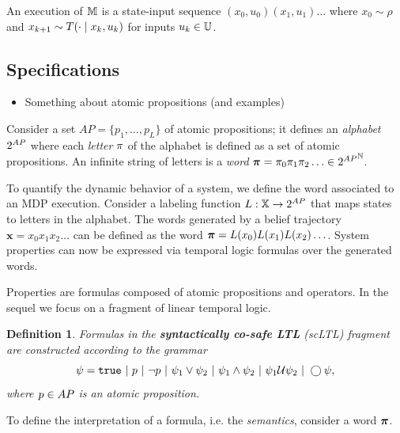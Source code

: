 \documentclass[conference]{IEEEtran}
\newtheorem{definition}{Definition}
\begin{document}
An execution of $\mathbb{M}$ is a state-input sequence $(x_0, u_0)(x_1, u_1)\ldots$ where $x_0 \sim \rho$ and $x_{k+1} \sim T(\cdot \mid x_k, u_k)$ for inputs $u_k \in \mathbb{U}$. 

\subsection{Specifications}

\begin{itemize}
  \item Something about atomic propositions (and examples)
\end{itemize}

Consider a set $AP = \{ p_1, \ldots, p_L \}$ of atomic propositions; it defines an \emph{alphabet} ${2^{AP}}$ where each \emph{letter} $\pi$ of the alphabet is defined as a set of atomic propositions. An infinite string of letters is a \emph{word} $\boldsymbol{\pi}=\pi_0\pi_1\pi_2\ldots\in{2^{AP}}^{\mathbb{N}}$.

To quantify the dynamic behavior of a system, we define the word associated to an MDP execution. Consider a labeling function $L: \mathbb{X} \rightarrow {2^{AP}}$ that maps states to letters in the alphabet. The words generated by a belief trajectory $\mathbf{x} = x_0 x_1 x_2 \ldots$ can be defined as the word $\boldsymbol{\pi} = L(x_0)L(x_1) L(x_2) \ldots$. System properties can now be expressed via temporal logic formulas over the generated words.

Properties are formulas composed of atomic propositions and operators. In the sequel we focus on a fragment of linear temporal logic. 
\begin{definition}
  \label{def:gdtl-syntax}
  Formulas in the \textbf{syntactically co-safe LTL} (scLTL) fragment are constructed according to the grammar
  \begin{equation*}
    \label{eq:scLTL}
    \psi =  \True \ |\ p \ |\ \lnot p \ |\ \psi_1 \vee\psi_2  \ |\ \psi_1 \land \psi_2 \ |\ \psi_1 \ltluntil \psi_2 \ |\ \ltlnext \psi,
  \end{equation*}
  where $p\in AP$ is an atomic proposition.
\end{definition}

To define the interpretation of a formula, i.e. the \emph{semantics}, consider a word $\boldsymbol{\pi}$.
\end{document}
